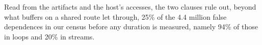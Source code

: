 Read from the artifacts and the host's accesses, the two clauses rule out, beyond what buffers on a shared route let through, 25\% of the 4.4 million false dependences in our census before any duration is measured, namely 94\% of those in loops and 20\% in streams.

